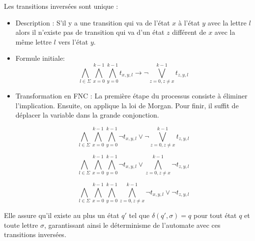 {}
\begin{tcolorbox}[defaultstyle,title=Contrainte de Réversibilité]
     Les transitions inversées sont unique :
        \begin{itemize}

        \item Description : S'il y a une transition qui va de l'état $x$ à l'état $y$ avec la lettre $l$ alors il n'existe pas de transition qui va d'un état $z$ différent de $x$ avec la même lettre $l$ vers l'état $y$. \\
        
        \item Formule initiale:
            \[\bigwedge\limits_{l\in \Sigma} \bigwedge\limits_{x=0}^{k-1}\bigwedge\limits_{y=0}^{k-1} t_{x,y,l} \rightarrow \lnot \bigvee\limits_{z=0, z\neq x}^{k-1} t_{z,y,l}\]

        \item Transformation en FNC : La première étape du processus consiste à éliminer l'implication. Ensuite, on applique la loi de Morgan. Pour finir, il suffit de déplacer la variable dans la grande conjonction.
            
            \[\bigwedge\limits_{l\in \Sigma} \bigwedge\limits_{x=0}^{k-1}\bigwedge\limits_{y=0}^{k-1} \lnot t_{x,y,l} \lor \lnot \bigvee\limits_{z=0, z\neq x}^{k-1} t_{z,y,l}\]

            \[\bigwedge\limits_{l\in \Sigma} \bigwedge\limits_{x=0}^{k-1}\bigwedge\limits_{y=0}^{k-1} \lnot t_{x,y,l} \lor \bigwedge\limits_{z=0, z\neq x}^{k-1} \lnot t_{z,y,l}\]
            
            \[\bigwedge\limits_{l\in \Sigma} \bigwedge\limits_{x=0}^{k-1}\bigwedge\limits_{y=0}^{k-1} \bigwedge\limits_{z=0, z\neq x}^{k-1} \lnot t_{x,y,l} \lor \lnot t_{z,y,l}\]


        \end{itemize}


Elle assure qu'il existe au plus un état \( q' \) tel que \( \delta(q', \sigma) = q \) pour tout état \( q \) et toute lettre \( \sigma \), garantissant ainsi le déterminisme de l'automate avec ces transitions inversées.
\end{tcolorbox}


